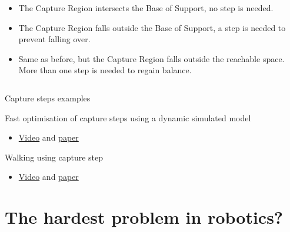 \documentclass[compress]{beamer}
\begin{document}
\begin{frame}[plain]
\begin{columns}
\begin{column}{0.5\linewidth}
\begin{itemize}
        \item The Capture Region intersects the Base of Support, no step is needed.
        \item The Capture Region falls outside the Base of Support, a step is needed
            to prevent falling over.
        \item Same as before, but the Capture Region falls outside the reachable
            space. More than one step is needed to regain balance.
    \end{itemize}
        \end{column}
    \end{columns}

\end{frame}

\begin{frame}{Capture steps examples}

    Fast optimisation of capture steps using a dynamic simulated model

    \begin{itemize}

        \item \href{http://spectrum.ieee.org/automaton/robotics/humanoids/japanese-high-power-humanoid-robot-hrp3l-jsk}{Video}
            and
            \href{http://ieeexplore.ieee.org/xpl/login.jsp?tp=\&arnumber=6100894\&url=http://ieeexplore.ieee.org/xpls/icp.jsp?arnumber\%3D6100894}{paper}
    \end{itemize}

    Walking using capture step

    \begin{itemize}

        \item \href{http://www.ais.uni-bonn.de/movies/WalkingWithCaptureSteps.wmv}{Video}
            and
            \href{http://www.ais.uni-bonn.de/papers/RoboCup_2014_Missura_Capture_Steps.pdf}{paper}
    \end{itemize}

\end{frame}

\section{The hardest problem in robotics?}

\end{document}
